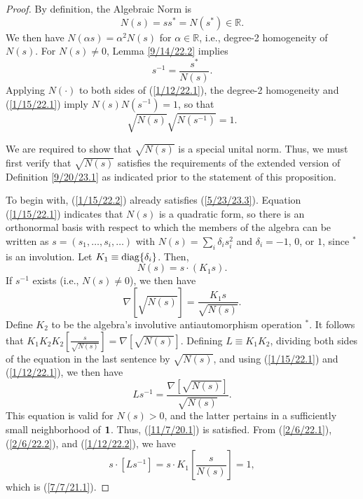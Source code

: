 \documentclass{amsart}
\numberwithin{equation}{section}
\theoremstyle{definition}
\numberwithin{theorem}{section}
\begin{document}
\begin{proof} By definition, the Algebraic Norm is \begin{equation}\label{1/15/22.1} N(s)= ss^* = N(s^*)\in\mathbb{R}.\end{equation} 
 We then have $N(\alpha s) = \alpha^2 N(s)$ for $\alpha\in \mathbb{R}$, i.e., degree-2 homogeneity of $N(s)$.  
For $N(s)\ne 0$, Lemma \ref{9/14/22.2} implies 
\begin{equation}\label{1/12/22.1} s^{-1} = \frac{s^*}{N(s)}.\end{equation}
Applying $N(\cdot)$ to both sides of  (\ref{1/12/22.1}), the degree-2 homogeneity and (\ref{1/15/22.1}) imply $N(s)N(s^{-1})=1$, so that \begin{equation}\label{1/15/22.2} \sqrt{N(s)}\sqrt{N(s^{-1})}=1. \end{equation}

We are required to show that $\sqrt{N(s)}$ is a special unital norm.  Thus, we must first verify that $\sqrt{N(s)}$ satisfies the requirements of the extended  version of Definition \ref{9/20/23.1} as indicated prior to the statement of this proposition. 

To begin with, (\ref{1/15/22.2}) already satisfies  (\ref{5/23/23.3}).
 Equation (\ref{1/15/22.1}) indicates that $N(s)$ is a quadratic form, so there is an orthonormal basis with respect to which the members of the algebra can be written as $s= (s_1,\dots, s_i,\dots)$ with $N(s) = \sum_i \delta_i s_i^2$ and $\delta_i = -1$, $0$, or $1$, since $^*$ is an involution.  Let $K_1 \equiv {\rm diag}\{\delta_i\}$.   Then, \begin{equation}\label{2/6/22.1} N(s) = s\cdot(K_1 s).\end{equation}
If $s^{-1}$ exists (i.e., $N(s)\ne 0$), we then have \begin{equation}\label{2/6/22.2} \nabla\left[\sqrt{N(s)}\right] = \frac{K_1s}{\sqrt{N(s)}}.\end{equation}  Define $K_2$ to be the algebra's involutive antiautomorphism operation $^*$.  It follows that $K_1K_2K_2[\frac{s}{\sqrt{N(s)}}] = \nabla\left[\sqrt{N(s)}\right]$. Defining $L\equiv K_1K_2$, dividing both sides of the equation in the last sentence by $\sqrt{N(s)}$, and using (\ref{1/15/22.1}) and (\ref{1/12/22.1}), we then have \begin{equation}\label{1/12/22.2} Ls^{-1}  = \frac{\nabla\left[\sqrt{N(s)}\right]}{\sqrt{N(s)}} .\end{equation} This equation  is valid for $N(s)>0$, and the latter pertains in a sufficiently small neighborhood of ${\bf 1}$.  Thus,  (\ref{11/7/20.1}) is satisfied.  From (\ref{2/6/22.1}), (\ref{2/6/22.2}), and (\ref{1/12/22.2}), we have \[ s\cdot [Ls^{-1}] = s\cdot K_1\left[\frac{s}{N(s)}\right] = 1,\] which is (\ref{7/7/21.1}).  
 

\end{proof}
\end{document}
